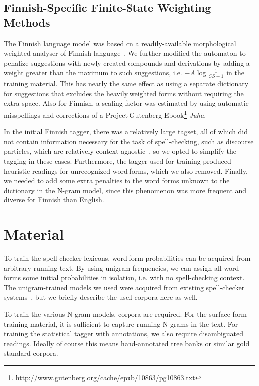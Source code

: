 \documentclass{llncs}
\begin{document}
\subsection{Finnish-Specific Finite-State Weighting Methods}

The Finnish language model was based on a readily-available morphological
weighted analyser of Finnish language~\cite{pirinen/2011/nodalida}.  We
further modified the automaton to penalize suggestions with newly created
compounds and derivations by adding a weight greater than the maximum to such suggestions, 
i.e. $-A\log\frac{1}{CS+1}$ in the training material. This has nearly the same effect as using a separate
dictionary for suggestions that excludes the heavily weighted forms without
requiring the extra space.  Also for Finnish, a scaling factor was estimated by using automatic misspellings and corrections
of a Project Gutenberg Ebook\footnote{\url{http://www.gutenberg.org/cache/epub/10863/pg10863.txt}} \emph{Juha}.

In the initial Finnish tagger, there was a relatively large tagset, all of
which did not contain information necessary for the task of
spell-checking, such as discourse particles, which are relatively
context-agnostic~\cite{visk}, so we opted to simplify the tagging in these
cases. Furthermore, the tagger used for training produced heuristic readings for
unrecognized word-forms, which we also removed. Finally, we needed to add
some extra penalties to the word forms unknown to the dictionary in the N-gram model,
since this phenomenon was more frequent and diverse for Finnish than English.

\section{Material}
\label{sec:material}

To train the spell-checker lexicons, word-form probabilities can be acquired
from arbitrary running text. By using unigram frequencies, we can assign
all word-forms some initial probabilities in isolation, i.e. with no spell-checking context.
The unigram-trained models we used were acquired from existing 
spell-checker systems~\cite{norvig/2010,pirinen/2010/lrec}, but we briefly
describe the used corpora here as well.

To train the various N-gram models, corpora are required. For the surface-form
training material, it is sufficient to capture running N-grams in the text.
For training the statistical tagger with annotations, we also require 
disambiguated readings. Ideally of course this means hand-annotated
tree banks or similar gold standard corpora. 
\end{document}
